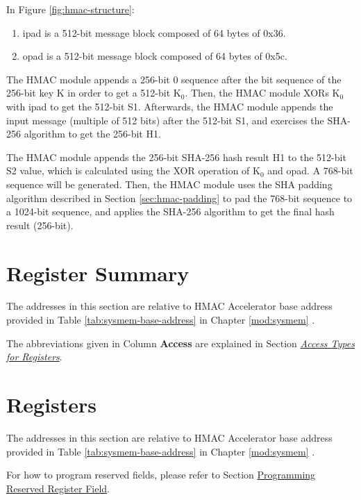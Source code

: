 \documentclass[main\_\_EN.tex]{subfiles}
\begin{document}
\newpage
In Figure \ref{fig:hmac-structure}:
\begin{enumerate}
    \item ipad is a 512-bit message block composed of 64 bytes of 0x36.
    \item opad is a 512-bit message block composed of 64 bytes of 0x5c.
\end{enumerate}

The HMAC module appends a 256-bit 0 sequence after the bit sequence of the 256-bit key K in order to get a 512-bit K$_0$. Then, the HMAC module XORs K$_0$ with ipad to get the 512-bit S1. Afterwards, the HMAC module appends the input message (multiple of 512 bits) after the 512-bit S1, and exercises the SHA-256 algorithm to get the 256-bit H1.

 The HMAC module appends the 256-bit SHA-256 hash result H1 to the 512-bit S2 value, which is calculated using the XOR operation of K$_0$ and opad. A 768-bit sequence will be generated. Then, the HMAC module uses the SHA padding algorithm described in Section \ref{sec:hmac-padding} to pad the 768-bit sequence to a 1024-bit sequence, and applies the SHA-256 algorithm to get the final hash result (256-bit).





\newpage
\hypertarget{hamc-reg-summ}{}
\section{Register Summary}
\label{sec:hmac-reg-summ}

The addresses in this section are relative to HMAC Accelerator base address provided in Table \ref{tab:sysmem-base-address} in Chapter \ref{mod:sysmem} \textit{}.

The abbreviations given in Column \textbf{Access} are explained in Section \hyperref[glossary-access-types]{\textit{Access Types for Registers}}.






\newpage
\section{Registers}

The addresses in this section are relative to HMAC Accelerator base address provided in Table \ref{tab:sysmem-base-address} in Chapter \ref{mod:sysmem} \textit{}.

For how to program reserved fields, please refer to Section \hyperref[programming-reserved-field]{Programming Reserved Register Field}.


\end{document}

